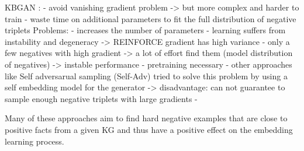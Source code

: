 KBGAN
\cite{zhang2021efficient}:
- avoid vanishing gradient problem 
-> but more complex and harder to train
- waste time on additional parameters to fit the full distribution of negative triplets
Problems: - increases the number of parameters
- learning suffers from instability and degeneracy
-> REINFORCE gradient has high variance
- only a few negatives with high gradient -> a lot of effort find them (model distribution of negatives)
-> instable performance
- pretraining necessary
- other approaches like Self adversarual sampling (Self-Adv) tried to solve this problem by using a self embedding model for the generator
-> disadvantage: can not guarantee to sample enough negative triplets with large gradients 
- %



Many of these approaches aim to find hard negative examples that are close to positive facts from a given \ac{KG} and thus have a positive effect on the embedding learning process.